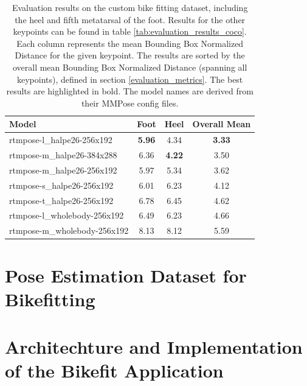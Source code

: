 \begin{table}[htbp]
    \centering
    \begin{tabular}{lccc}
        \toprule
        \textbf{Model}               & \textbf{Foot} & \textbf{Heel} & \textbf{Overall Mean} \\

        \midrule
        rtmpose-l\_halpe26-256x192   & \textbf{5.96} & 4.34          & \textbf{3.33}         \\
        rtmpose-m\_halpe26-384x288   & 6.36          & \textbf{4.22} & 3.50                  \\
        rtmpose-m\_halpe26-256x192   & 5.97          & 5.34          & 3.62                  \\
        rtmpose-s\_halpe26-256x192   & 6.01          & 6.23          & 4.12                  \\
        rtmpose-t\_halpe26-256x192   & 6.78          & 6.45          & 4.62                  \\
        rtmpose-l\_wholebody-256x192 & 6.49          & 6.23          & 4.66                  \\
        rtmpose-m\_wholebody-256x192 & 8.13          & 8.12          & 5.59                  \\
        \bottomrule
    \end{tabular}
    \caption{Evaluation results on the custom bike fitting dataset, including the heel and fifth metatarsal of the foot. Results for the other keypoints can be found in table \ref{tab:evaluation_results_coco}. Each column represents the mean Bounding Box Normalized Distance for the given keypoint. The results are sorted by the overall mean Bounding Box Normalized Distance (spanning all keypoints), defined in section \ref{evaluation_metrics}. The best results are highlighted in bold. The model names are derived from their MMPose config files.}
    \label{tab:evaluation_results_wholebody}

\end{table}




\chapter{Pose Estimation Dataset for Bikefitting}


\chapter{Architechture and Implementation of the Bikefit Application}

